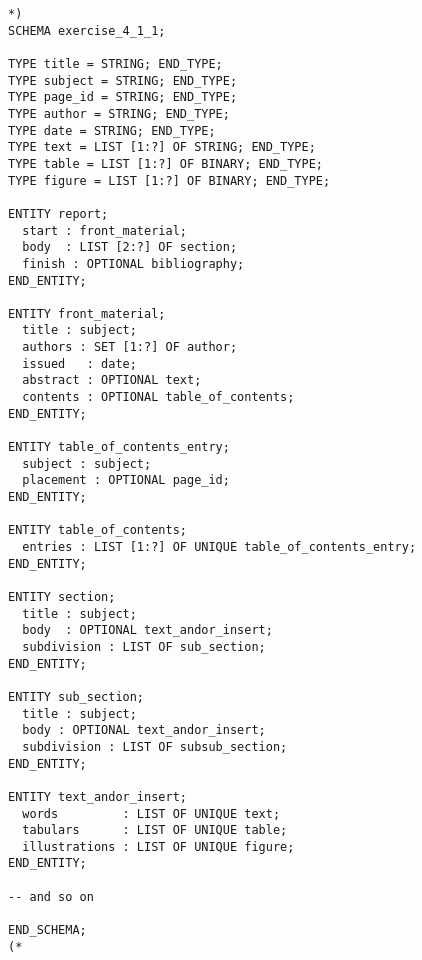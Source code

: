 \documentclass{article}
\newenvironment{code}{}{}
\begin{document}
\begin{code}
\begin{verbatim}
*)
SCHEMA exercise_4_1_1;

TYPE title = STRING; END_TYPE;
TYPE subject = STRING; END_TYPE;
TYPE page_id = STRING; END_TYPE;
TYPE author = STRING; END_TYPE;
TYPE date = STRING; END_TYPE;
TYPE text = LIST [1:?] OF STRING; END_TYPE;
TYPE table = LIST [1:?] OF BINARY; END_TYPE;
TYPE figure = LIST [1:?] OF BINARY; END_TYPE;

ENTITY report;
  start : front_material;
  body  : LIST [2:?] OF section;
  finish : OPTIONAL bibliography;
END_ENTITY;

ENTITY front_material;
  title : subject;
  authors : SET [1:?] OF author;
  issued   : date;
  abstract : OPTIONAL text;
  contents : OPTIONAL table_of_contents;
END_ENTITY;

ENTITY table_of_contents_entry;
  subject : subject;
  placement : OPTIONAL page_id;
END_ENTITY;

ENTITY table_of_contents;
  entries : LIST [1:?] OF UNIQUE table_of_contents_entry;
END_ENTITY;

ENTITY section;
  title : subject;
  body  : OPTIONAL text_andor_insert;
  subdivision : LIST OF sub_section;
END_ENTITY;

ENTITY sub_section;
  title : subject;
  body : OPTIONAL text_andor_insert;
  subdivision : LIST OF subsub_section;
END_ENTITY;

ENTITY text_andor_insert;
  words         : LIST OF UNIQUE text;
  tabulars      : LIST OF UNIQUE table;
  illustrations : LIST OF UNIQUE figure;
END_ENTITY;

-- and so on

END_SCHEMA;
(*
\end{verbatim}
\end{code}
\end{document}
